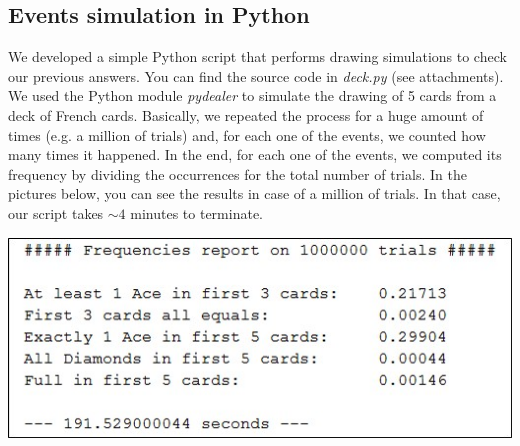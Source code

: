 \subsection{Events simulation in Python}
We developed a simple Python script that performs drawing simulations to check our previous answers. You can find the source code in \textit{deck.py} (see attachments).
We used the Python module \textit{pydealer}\cite{pydealer} to simulate the drawing of 5 cards from a deck of French cards. Basically, we repeated the process for a huge amount of times (e.g. a million of trials) and, for each one of the events, we counted how many times it happened.
In the end, for each one of the events, we computed its frequency by dividing the occurrences for the total number of trials.
In the pictures below, you can see the results in case of a million of trials. In that case, our script takes $\sim4$ minutes to terminate.

\begin{center}
	\includegraphics[]{img/deck.jpg}
\end{center}
